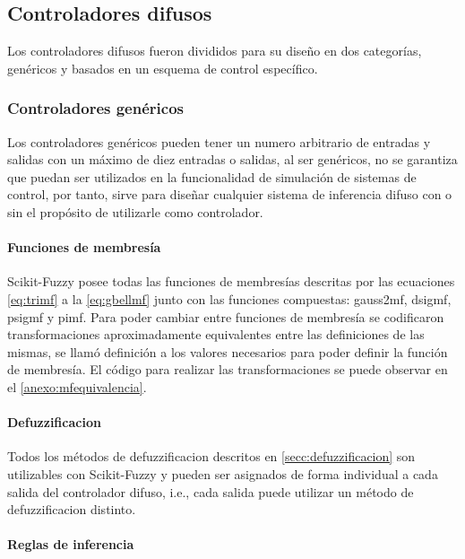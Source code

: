     \subsection{Controladores difusos}

        Los controladores difusos fueron divididos para su diseño en dos categorías, genéricos y basados en un esquema de control específico.
        
        \subsubsection{Controladores genéricos}

            Los controladores genéricos pueden tener un numero arbitrario de entradas y salidas con un máximo de diez entradas o salidas, al ser genéricos, no se garantiza que puedan ser utilizados en la funcionalidad de simulación de sistemas de control, por tanto, sirve para diseñar cualquier sistema de inferencia difuso con o sin el propósito de utilizarle como controlador.

            \paragraph{Funciones de membresía}

                Scikit-Fuzzy posee todas las funciones de membresías descritas por las ecuaciones \cref{eq:trimf} a la \cref{eq:gbellmf} junto con las funciones compuestas: gauss2mf, dsigmf, psigmf y pimf. Para poder cambiar entre funciones de membresía se codificaron transformaciones aproximadamente equivalentes entre las definiciones de las mismas, se llamó definición a los valores necesarios para poder definir la función de membresía. El código para realizar las transformaciones se puede observar en el \ref{anexo:mfequivalencia}.

            \paragraph{Defuzzificacion}

                Todos los métodos de defuzzificacion descritos en \cref{secc:defuzzificacion} son utilizables con Scikit-Fuzzy y pueden ser asignados de forma individual a cada salida del controlador difuso, i.e., cada salida puede utilizar un método de defuzzificacion distinto.

            \paragraph{Reglas de inferencia}

